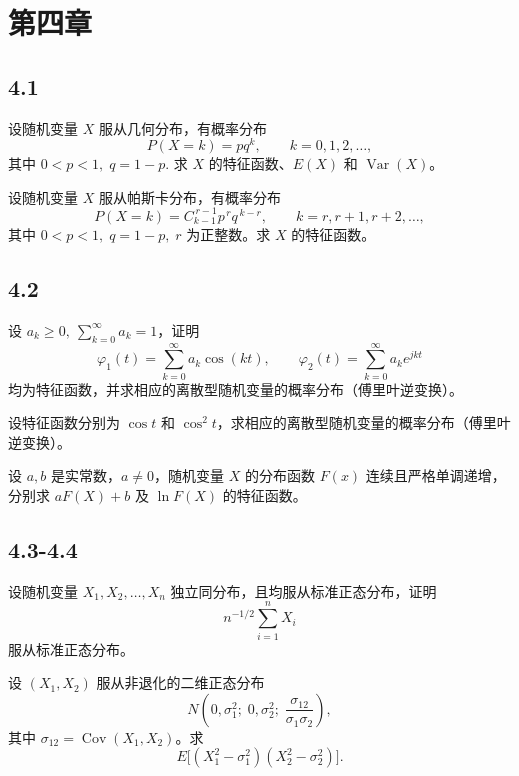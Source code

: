 \section{第四章}
\subsection*{4.1 }
\begin{homework}[4.1]
设随机变量 $X$ 服从几何分布，有概率分布
\[
P(X=k)=pq^{k},\qquad k=0,1,2,\ldots,
\]
其中 $0<p<1,\; q=1-p$. 求 $X$ 的特征函数、$E(X)$ 和 $\operatorname{Var}(X)$。
\end{homework}

\begin{homework}[4.2]
设随机变量 $X$ 服从帕斯卡分布，有概率分布
\[
P(X=k)=C_{k-1}^{\,r-1} p^{\,r} q^{\,k-r},\qquad k=r,r+1,r+2,\ldots,
\]
其中 $0<p<1,\; q=1-p,\; r$ 为正整数。求 $X$ 的特征函数。
\end{homework}
\subsection*{4.2}
\begin{homework}[4.5]
设 $a_k\ge 0,\ \sum_{k=0}^\infty a_k=1$，证明
\[
\varphi_1(t)=\sum_{k=0}^\infty a_k \cos(kt), 
\qquad 
\varphi_2(t)=\sum_{k=0}^\infty a_k e^{jkt}
\]
均为特征函数，并求相应的离散型随机变量的概率分布（傅里叶逆变换）。
\end{homework}

\begin{homework}[4.6]
设特征函数分别为 $\cos t$ 和 $\cos^2 t$，求相应的离散型随机变量的概率分布（傅里叶逆变换）。
\end{homework}

\begin{homework}[4.7]
设 $a,b$ 是实常数，$a\neq 0$，随机变量 $X$ 的分布函数 $F(x)$ 连续且严格单调递增，分别求 $aF(X)+b$ 及 $\ln F(X)$ 的特征函数。
\end{homework}
\subsection*{4.3-4.4}
\begin{homework}[4.11]
设随机变量 $X_1,X_2,\ldots,X_n$ 独立同分布，且均服从标准正态分布，证明  
\[
n^{-1/2}\sum_{i=1}^n X_i
\]
服从标准正态分布。
\end{homework}

\begin{homework}[4.12]
设 $(X_1,X_2)$ 服从非退化的二维正态分布  
\[
N\!\left(0,\sigma_1^2; \; 0,\sigma_2^2;\; \frac{\sigma_{12}}{\sigma_1\sigma_2}\right),
\]
其中 $\sigma_{12}=\operatorname{Cov}(X_1,X_2)$。求  
\[
E\bigl[(X_1^2-\sigma_1^2)(X_2^2-\sigma_2^2)\bigr].
\]
\end{homework}
